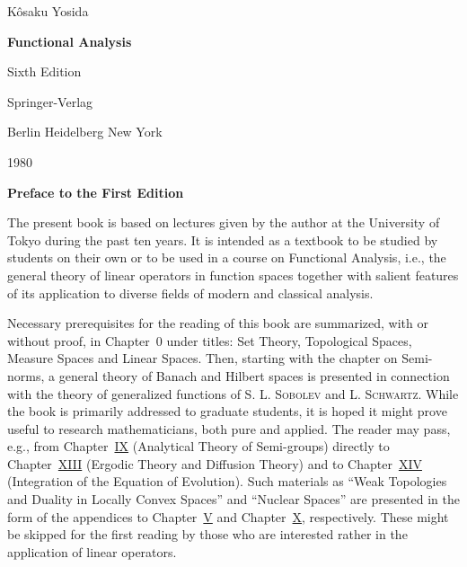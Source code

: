\begin{titlepage}
\thispagestyle{front}
\vspace*{30mm}
\begin{center}
{\Large K\^osaku Yosida\par}
\vspace{12mm}
{\huge\bfseries Functional Analysis\par}
\vspace{10mm}
{\large Sixth Edition\par}
\vspace{14mm}
{\large Springer-Verlag\par Berlin Heidelberg New York\par}
{\large 1980\par}
\end{center}
\end{titlepage}
\setcounter{page}{5}
\vspace{6mm}\begin{center}\bfseries Preface to the First Edition\end{center}\vspace{2mm}
The present book is based on lectures given by the author at the University of Tokyo during the past ten years. It is intended as a textbook to be studied by students on their own or to be used in a course on Functional Analysis, i.e., the general theory of linear operators in function spaces together with salient features of its application to diverse fields of modern and classical analysis. 

Necessary prerequisites for the reading of this book are summarized, with or without proof, in Chapter~\hyperref[chap:0]{$0$} under titles: Set Theory, Topological Spaces, Measure Spaces and Linear Spaces. Then, starting with the chapter on Semi-norms, a general theory of Banach and Hilbert spaces is presented in connection with the theory of generalized functions of S. L. \textsc{Sobolev} and L. \textsc{Schwartz}. While the book is primarily addressed to graduate students, it is hoped it might prove useful to research mathematicians, both pure and applied. The reader may pass, e.g., from Chapter~\hyperref[chap:IX]{IX} (Analytical Theory of Semi-groups) directly to Chapter~\hyperref[chap:XIII]{XIII} (Ergodic Theory and Diffusion Theory) and to Chapter~\hyperref[chap:XIV]{XIV} (Integration of the Equation of Evolution). Such materials as ``Weak Topologies and Duality in Locally Convex Spaces'' and ``Nuclear Spaces'' are presented in the form of the appendices to Chapter~\hyperref[chap:V]{V} and Chapter~\hyperref[chap:X]{X}, respectively. These might be skipped for the first reading by those who are interested rather in the application of linear operators. 

